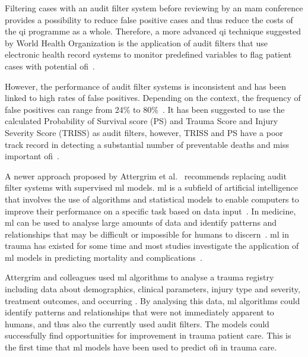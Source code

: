 \documentclass[12pt, a4paper]{article}
\begin{document}
Filtering cases with an audit filter system before reviewing by an \acrshort{mam} conference provides a possibility to
reduce false positive cases and thus reduce the costs of the \acrshort{qi} programme as a whole. Therefore, a more
advanced \acrshort{qi} technique suggested by World Health Organization is the application of audit filters that use
electronic health record systems to monitor predefined variables to flag patient cases with potential
\acrfull{ofi}~\cite{world_health_organization_guidelines_2009}.

However, the performance of audit filter systems is inconsistent and has been linked to high rates of false positives.
Depending on the context, the frequency of false positives can range from 24\% to
80\%~\cite{attergrim_predicting_2023,sanddal_analysis_2011,roy_learning_2017,ghorbani_analysis_2018}. It has been
suggested to use the calculated Probability of Survival score (PS) and Trauma Score and Injury Severity Score (TRISS)
as audit filters, however, TRISS and PS have a poor track record in detecting a substantial number of preventable
deaths and miss important \acrshort{ofi}~\cite{heim_survival_2016}.

A newer approach proposed by Attergrim et al.~\cite{attergrim_predicting_2023} recommends replacing audit filter
systems with supervised \acrfull{ml} models. \acrshort{ml} is a subfield of artificial intelligence that involves the
use of algorithms and statistical models to enable computers to improve their performance on a specific task based on
data input~\cite{greener_guide_2022}. In medicine, \acrshort{ml} can be used to analyse large amounts of data and
identify patterns and relationships that may be difficult or impossible for humans to
discern~\cite{greener_guide_2022}. \acrshort{ml} in trauma has existed for some time and most studies investigate the
application of \acrshort{ml} models in predicting mortality and complications~\cite{zhang_machine_2022}.

Attergrim and colleagues used \acrshort{ml} algorithms to analyse a trauma registry including data about demographics,
clinical parameters, injury type and severity, treatment outcomes, and occurring . By analysing this
data, \acrshort{ml} algorithms could identify patterns and relationships that were not immediately apparent to humans,
and thus also the currently used audit filters. The models could successfully find opportunities for improvement in
trauma patient care. This is the first time that \acrshort{ml} models have been used to predict \acrshort{ofi} in
trauma care.~\cite{attergrim_predicting_2023}
\end{document}
